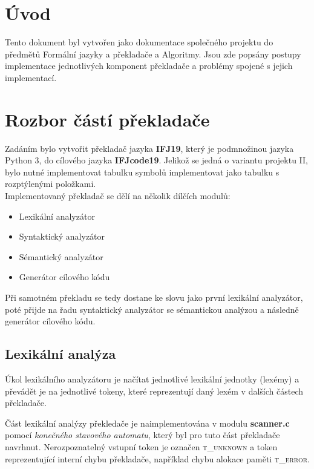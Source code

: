 \documentclass[12pt]{article}
\begin{document}
\tableofcontents
\newpage
\section{Úvod}
Tento dokument byl vytvořen jako dokumentace společného projektu do předmětů Formální jazyky a pře\-kla\-da\-če a Algoritmy. Jsou zde popsány postupy implementace jednotlivých komponent překladače a problémy spojené s jejich implementací.
\section{Rozbor částí překladače}
Zadáním bylo vytvořit překladač jazyka \textbf{IFJ19}, který je podmnožinou jazyka Python 3, do cílového jazyka \textbf{IFJcode19}.
Jelikož se jedná o variantu projektu II, bylo nutné implementovat tabulku symbolů implementovat jako tabulku s rozptýlenými položkami.
\\
Implementovaný překladač se dělí na několik dílčích modulů:
\begin{itemize}
  \item Lexikální analyzátor
  \item Syntaktický analyzátor
  \item Sémantický analyzátor
  \item Generátor cílového kódu
\end{itemize}
Při samotném překladu se tedy dostane ke slovu jako první lexikální analyzátor, poté přijde na řadu syntaktický analyzátor se sémantickou analýzou a následně generátor cílového kódu. 
\subsection{Lexikální analýza}
Úkol lexikálního analyzátoru je načítat jednotlivé lexikální jednotky (lexémy) a převádět je na jednotlivé tokeny, které reprezentují daný lexém v dalších částech překladače. 

Část lexikální analýzy překledače je naimplementována v modulu \textbf{scanner.c} pomocí \textit{konečného stavového automatu}, který byl pro tuto část překladače navrhnut. Nerozpoznatelný vstupní token je označen \textsc{t\_unknown} a token reprezentující interní chybu překladače, například chybu alokace paměti \textsc{t\_error}.
\end{document}
